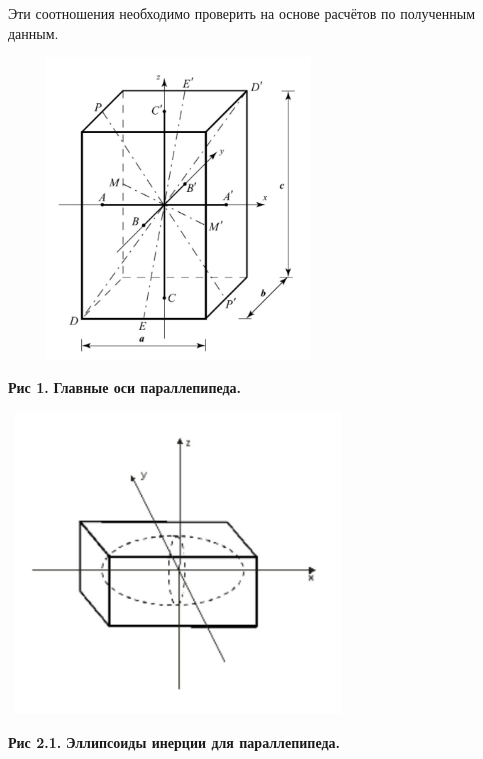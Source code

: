     Эти соотношения необходимо проверить на основе расчётов по полученным данным.

\begin{center}
\includegraphics[width=9cm, height=8cm]{parped.jpeg}
\end{center}

\begin{flushright}
{\scriptsize \textbf{Рис 1.} \textbf {Главные оси параллепипеда.}}
\end{flushright}

\begin{center}
\includegraphics[width=9cm, height=8cm]{iner_parped.jpeg}
\end{center}

\begin{flushright}
{\scriptsize \textbf{Рис 2.1.} \textbf {Эллипсоиды инерции для параллепипеда.}}
\end{flushright}    

